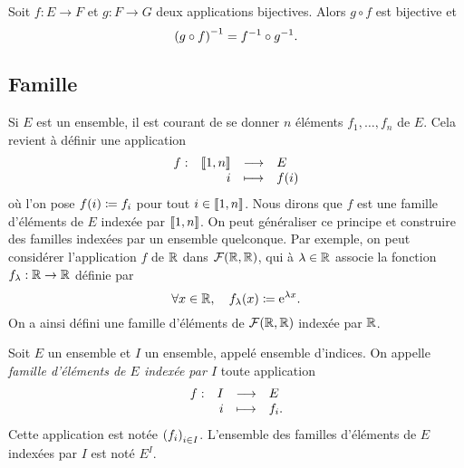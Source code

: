 \documentclass{magnoliaold}
\begin{document}

\begin{proposition}[utile=-3]
Soit $f:E\to F$ et $g:F\to G$ deux applications bijectives. Alors $g\circ f$
est bijective et
\[\left(g\circ f\right)^{-1}=f^{-1} \circ g^{-1}.\]
\end{proposition}

\subsection{Famille}

Si $E$ est un ensemble, il est courant de se donner $n$ éléments
$f_1,\ldots,f_n$ de $E$. Cela revient à définir une application
\[\begin{array}[t]{lrcl} \displaystyle{f} : & \displaystyle{\left\llbracket 1,n\right\rrbracket} & \longrightarrow & \displaystyle{E} \\ & \displaystyle{i} & \longmapsto & \displaystyle{f(i)} \end{array}\]
où l'on pose $f(i)\coloneqq f_i$ pour tout $i\in\left\llbracket 1,n\right\rrbracket$. Nous dirons que $f$ est une
famille d'éléments de $E$ indexée par $\left\llbracket 1,n\right\rrbracket$. On peut généraliser ce principe
et construire des familles indexées par un ensemble quelconque. Par exemple, on peut considérer
l'application $f$ de $\mathbb{R}$ dans $\mathcal{F}(\mathbb{R}, \mathbb{R})$, qui à $\lambda\in\mathbb{R}$ associe la
fonction $f_\lambda:\mathbb{R}\to\mathbb{R}$ définie par
\[\forall x\in\mathbb{R},\quad f_\lambda(x)\coloneqq{\rm e}^{\lambda x}.\]
On a ainsi défini une famille d'éléments de $\mathcal{F}(\mathbb{R}, \mathbb{R})$ indexée par $\mathbb{R}$.

\begin{definition}[utile=-3]
Soit $E$ un ensemble et $I$ un ensemble, appelé ensemble d'indices. On appelle
\emph{famille d'éléments de $E$ indexée par $I$} toute application
\[\begin{array}[t]{lrcl} \displaystyle{f} : & \displaystyle{I} & \longrightarrow & \displaystyle{E} \\ & \displaystyle{i} & \longmapsto & \displaystyle{f_i.} \end{array}\]
Cette application est notée $\left(f_i\right)_{i\in I}$. L'ensemble des familles
d'éléments de $E$ indexées par $I$ est noté $E^I$.
\end{definition}
\end{document}
